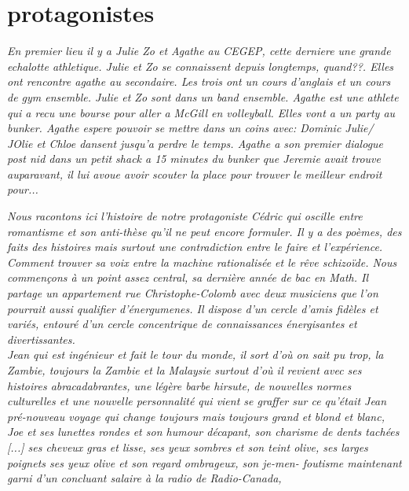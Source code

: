 \documentclass{article}
\begin{document}
\renewcommand{\baselinestretch}{1.25}

\section{protagonistes}

\textit{En premier lieu il y a Julie Zo et Agathe au CEGEP, cette derniere une
    grande echalotte athletique.  Julie et Zo se connaissent depuis longtemps,
    quand??. Elles ont rencontre agathe au secondaire.  Les trois ont un cours
    d'anglais et un cours de gym ensemble. Julie et Zo sont dans un band ensemble.
    Agathe est une athlete qui a recu une bourse pour aller a McGill en volleyball.
    Elles vont a un party au bunker.  Agathe espere pouvoir se mettre dans un coins
    avec: Dominic  Julie/ JOlie et Chloe dansent jusqu'a perdre le temps. Agathe a son premier
    dialogue post nid dans un petit shack a 15 minutes du bunker que Jeremie avait trouve
    auparavant, il lui avoue avoir scouter la place pour trouver le meilleur endroit pour... }

\textit{Nous racontons ici l'histoire de notre protagoniste Cédric qui oscille
  entre romantisme et son anti-thèse qu'il ne peut encore formuler. Il y a des
  poèmes, des faits des histoires mais surtout une contradiction entre le faire
  et l'expérience. Comment trouver sa voix entre la machine rationalisée et le
  rêve schizoïde. Nous commençons à un point assez central, sa dernière année de
  bac en Math. Il partage un appartement rue Christophe-Colomb avec deux
  musiciens que l'on pourrait aussi qualifier d'énergumenes. Il dispose d'un
  cercle d'amis fidèles et variés, entouré d'un cercle concentrique de
  connaissances énergisantes et divertissantes.}\\


\textit{Jean qui est ingénieur et fait le tour du monde, il sort d’où on sait pu
  trop, la Zambie, toujours la Zambie et la Malaysie surtout d’où il revient
  avec ses histoires abracadabrantes, une légère barbe hirsute, de nouvelles
  normes culturelles et une nouvelle personnalité qui vient se graffer sur ce
  qu’était Jean pré-nouveau voyage qui change toujours mais toujours grand et
  blond et blanc,}\\

\textit{Joe et ses lunettes rondes et son humour décapant, son charisme de dents
  tachées [...] ses cheveux gras et lisse, ses yeux sombres et son teint olive,
  ses larges poignets ses yeux olive et son regard ombrageux, son je-men-
  foutisme maintenant garni d’un concluant salaire à la radio de Radio-Canada,}\\
\end{document}
